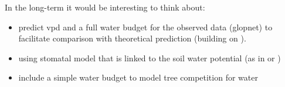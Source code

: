 \documentclass[a4paper,11pt]{article}
\begin{document}
In the long-term it would be interesting to think about:

\begin{itemize}

\item predict vpd and a full water budget for the observed data (glopnet) to facilitate comparison with theoretical prediction (building on \citet{Prentice-2014}).

\item using stomatal model that is linked to the soil water potential (as in \citet{Sperry-2016} or
\citet{Sterck-2011})

\item include a simple water budget to model tree competition for water

\end{itemize}














\end{document}
